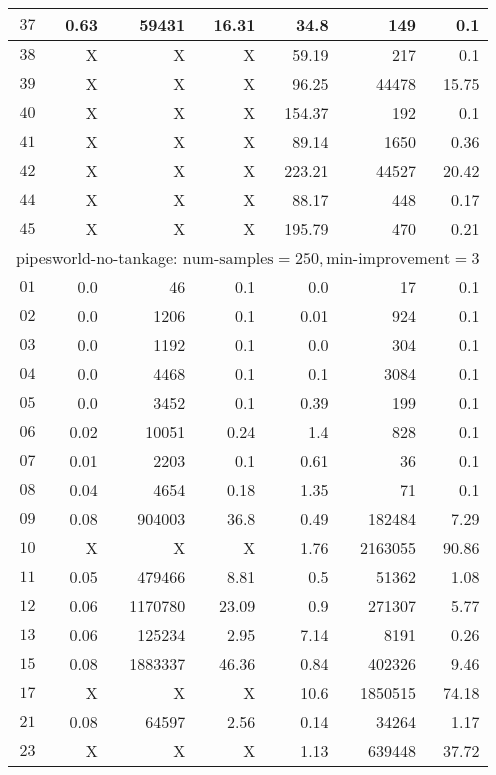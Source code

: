 \begin{longtable}{|c||r|r|r||r|r|r|}
$37$ & 0.63 & 59431 & 16.31 &34.8 & 149 & 0.1 \\\hline
$38$ & X & X & X &59.19 & 217 & 0.1 \\\hline
$39$ & X & X & X &96.25 & 44478 & 15.75 \\\hline
$40$ & X & X & X &154.37 & 192 & 0.1 \\\hline
$41$ & X & X & X &89.14 & 1650 & 0.36 \\\hline
$42$ & X & X & X &223.21 & 44527 & 20.42 \\\hline
$44$ & X & X & X &88.17 & 448 & 0.17 \\\hline
$45$ & X & X & X &195.79 & 470 & 0.21 \\\hline

\multicolumn{7}{|l|}{pipesworld-no-tankage: $\text{num-samples}=250,\text{min-improvement}=3$}\\\hline
$01$ & 0.0 & 46 & 0.1 &0.0 & 17 & 0.1 \\\hline
$02$ & 0.0 & 1206 & 0.1 &0.01 & 924 & 0.1 \\\hline
$03$ & 0.0 & 1192 & 0.1 &0.0 & 304 & 0.1 \\\hline
$04$ & 0.0 & 4468 & 0.1 &0.1 & 3084 & 0.1 \\\hline
$05$ & 0.0 & 3452 & 0.1 &0.39 & 199 & 0.1 \\\hline
$06$ & 0.02 & 10051 & 0.24 &1.4 & 828 & 0.1 \\\hline
$07$ & 0.01 & 2203 & 0.1 &0.61 & 36 & 0.1 \\\hline
$08$ & 0.04 & 4654 & 0.18 &1.35 & 71 & 0.1 \\\hline
$09$ & 0.08 & 904003 & 36.8 &0.49 & 182484 & 7.29 \\\hline
$10$ & X & X & X &1.76 & 2163055 & 90.86 \\\hline
$11$ & 0.05 & 479466 & 8.81 &0.5 & 51362 & 1.08 \\\hline
$12$ & 0.06 & 1170780 & 23.09 &0.9 & 271307 & 5.77 \\\hline
$13$ & 0.06 & 125234 & 2.95 &7.14 & 8191 & 0.26 \\\hline
$15$ & 0.08 & 1883337 & 46.36 &0.84 & 402326 & 9.46 \\\hline
$17$ & X & X & X &10.6 & 1850515 & 74.18 \\\hline
$21$ & 0.08 & 64597 & 2.56 &0.14 & 34264 & 1.17 \\\hline
$23$ & X & X & X &1.13 & 639448 & 37.72 \\\hline


\end{longtable}
